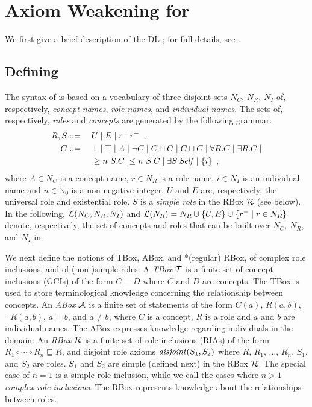 \documentclass[
]{ceurart}
\begin{document}
\section{Axiom Weakening for \SROIQ}

We first give a brief description of the DL \SROIQ; for full details, see \cite{baader_horrocks_lutz_sattler_2017,HorrocksKutzSattlerKR2006}. 

\subsection{Defining \SROIQ}

The syntax of \SROIQ is based on a vocabulary of three disjoint sets $N_C$, $N_R$, $N_I$ of, respectively, \emph{concept names}, \emph{role names}, and \emph{individual names}. The sets of, respectively, \SROIQ  \emph{roles} and \SROIQ \emph{concepts} are generated by the following grammar.
\begin{alignat*}{2}
  R, S &::={} && U \mid E \mid r \mid r^{-} \enspace,\\
  C &::= && \bot \mid \top \mid A \mid \neg C \mid C \sqcap C \mid C \sqcup C \mid \forall R.C \mid \exists R.C \mid \\ 
  &&& \geq n~S.C \mid \leq n~S.C \mid \exists S.\mathit{Self} \mid \{i\} \enspace,
\end{alignat*}
where $A \in N_C$ is a concept name, $r \in N_R$ is a role name, $i \in N_I$ is an individual name and $n \in \mathbb{N}_0$ is a non-negative integer. 
%
$U$ and $E$ are, respectively, the universal role and existential role. $S$ is a \emph{simple role} in the RBox $\mathcal{R}$ (see below). In the following, $\mathcal{L}(N_C, N_R, N_I)$ and $\mathcal{L}(N_R) = N_R \cup \{U, E\} \cup \{r^- \mid r \in N_R\}$ denote, respectively, the set of concepts and roles that can be built over $N_C$, $N_R$, and $N_I$ in \SROIQ.

We next define the notions of TBox, ABox, and *(regular) RBox, of complex role inclusions, and of (non-)simple roles:
A \emph{TBox} $\mathcal{T}$ is a finite set of concept inclusions (GCIs) of the form $C \sqsubseteq D$ where $C$ and $D$ are concepts. The TBox is used to store terminological knowledge concerning the relationship between concepts. 
%
An \emph{ABox} $\mathcal{A}$ is a finite set of statements of the form $C(a)$, $R(a,b)$, $\lnot R (a,b)$, $a = b$, and $a \not= b$, where $C$ is a concept, $R$ is a role and $a$ and $b$ are individual names. The ABox expresses knowledge regarding individuals in the domain. 
%
An \emph{RBox} $\mathcal{R}$ is a finite set of role inclusions (RIAs) of the form $R_1 \circ \cdots \circ R_n \sqsubseteq R$, and disjoint role axioms $\mathit{disjoint}(S_1, S_2)$ where $R$, $R_1$, $\dots$, $R_n$, $S_1$, and $S_2$ are roles. $S_1$ and $S_2$ are simple (defined next) in the RBox $\mathcal{R}$. The special case of $n = 1$ is a simple role inclusion, while we call the cases where $n > 1$ \emph{complex role inclusions}. The RBox represents knowledge about the relationships between roles.
\end{document}
